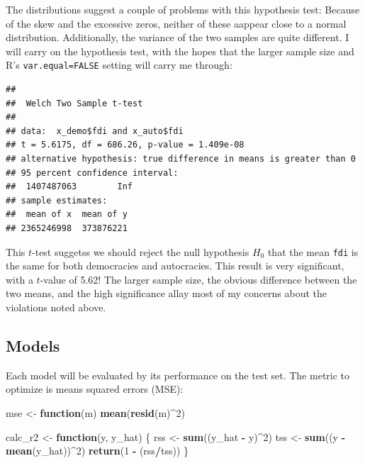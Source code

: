 \documentclass[11pt,]{article}
\newenvironment{Shaded}{\begin{snugshade}}{\end{snugshade}}
\newcommand{\ControlFlowTok}[1]{\textcolor[rgb]{0.13,0.29,0.53}{\textbf{#1}}}
\newcommand{\DataTypeTok}[1]{\textcolor[rgb]{0.13,0.29,0.53}{#1}}
\newcommand{\DecValTok}[1]{\textcolor[rgb]{0.00,0.00,0.81}{#1}}
\newcommand{\FloatTok}[1]{\textcolor[rgb]{0.00,0.00,0.81}{#1}}
\newcommand{\KeywordTok}[1]{\textcolor[rgb]{0.13,0.29,0.53}{\textbf{#1}}}
\newcommand{\NormalTok}[1]{#1}
\newcommand{\OperatorTok}[1]{\textcolor[rgb]{0.81,0.36,0.00}{\textbf{#1}}}
\newcommand{\OtherTok}[1]{\textcolor[rgb]{0.56,0.35,0.01}{#1}}
\newcommand{\StringTok}[1]{\textcolor[rgb]{0.31,0.60,0.02}{#1}}
\begin{document}
The distributions suggest a couple of problems with this hypothesis
test: Because of the skew and the excessive zeros, neither of these
aappear close to a normal distribution. Additionally, the variance of
the two samples are quite different. I will carry on the hypothesis
test, with the hopes that the larger sample size and R's
\texttt{var.equal=FALSE} setting will carry me through:

\begin{Shaded}
\end{Shaded}

\begin{verbatim}
## 
##  Welch Two Sample t-test
## 
## data:  x_demo$fdi and x_auto$fdi
## t = 5.6175, df = 686.26, p-value = 1.409e-08
## alternative hypothesis: true difference in means is greater than 0
## 95 percent confidence interval:
##  1407487063        Inf
## sample estimates:
##  mean of x  mean of y 
## 2365246998  373876221
\end{verbatim}

This \(t\)-test suggetss we should reject the null hypothesis \(H_0\)
that the mean \texttt{fdi} is the same for both democracies and
autocracies. This result is very significant, with a \(t\)-value of
5.62! The larger sample size, the obvious difference between the two
means, and the high significance allay most of my concerns about the
violations noted above.

\hypertarget{models}{%
\subsection{Models}\label{models}}

Each model will be evaluated by its performance on the test set. The
metric to optimize is means squared errors (MSE):

\begin{Shaded}
\begin{Highlighting}[]
\NormalTok{mse <-}\StringTok{ }\ControlFlowTok{function}\NormalTok{(m) }\KeywordTok{mean}\NormalTok{(}\KeywordTok{resid}\NormalTok{(m)}\OperatorTok{^}\DecValTok{2}\NormalTok{)}

\NormalTok{calc_r2 <-}\StringTok{ }\ControlFlowTok{function}\NormalTok{(y, y_hat) \{}
\NormalTok{    rss <-}\StringTok{ }\KeywordTok{sum}\NormalTok{((y_hat }\OperatorTok{-}\StringTok{ }\NormalTok{y)}\OperatorTok{^}\DecValTok{2}\NormalTok{)}
\NormalTok{    tss <-}\StringTok{ }\KeywordTok{sum}\NormalTok{((y }\OperatorTok{-}\StringTok{ }\KeywordTok{mean}\NormalTok{(y_hat))}\OperatorTok{^}\DecValTok{2}\NormalTok{)}
    \KeywordTok{return}\NormalTok{(}\DecValTok{1} \OperatorTok{-}\StringTok{ }\NormalTok{(rss}\OperatorTok{/}\NormalTok{tss))}
\NormalTok{\}}
\end{Highlighting}
\end{Shaded}
\end{document}
